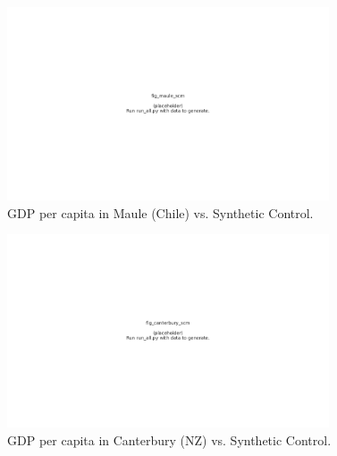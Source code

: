 \begin{figure}[H]
\centering
\includegraphics[width=0.85\textwidth]{figures/fig_maule_scm.pdf}
\caption{GDP per capita in Maule (Chile) vs. Synthetic Control.}
\label{fig:maule_scm}
\end{figure}

\begin{figure}[H]
\centering
\includegraphics[width=0.85\textwidth]{figures/fig_canterbury_scm.pdf}
\caption{GDP per capita in Canterbury (NZ) vs. Synthetic Control.}
\label{fig:canterbury_scm}
\end{figure}
